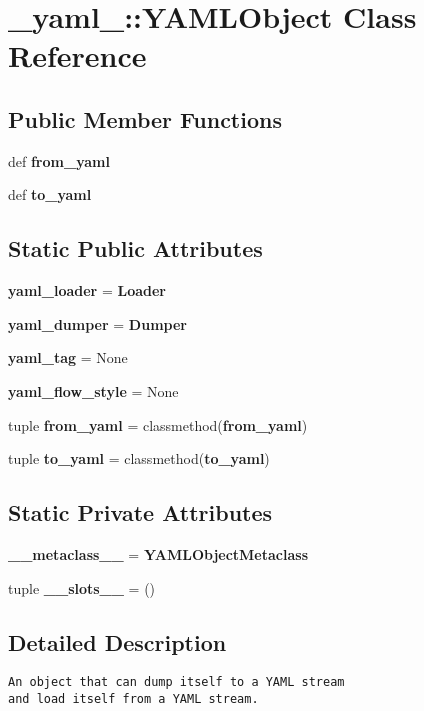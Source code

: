 \section{\_\-yaml\_\-::YAMLObject Class Reference}
\label{class__yaml___1_1YAMLObject}
\subsection*{Public Member Functions}
\begin{CompactItemize}
\item 
def {\bf from\_\-yaml}
\item 
def {\bf to\_\-yaml}
\end{CompactItemize}
\subsection*{Static Public Attributes}
\begin{CompactItemize}
\item 
{\bf yaml\_\-loader} = {\bf Loader}
\item 
{\bf yaml\_\-dumper} = {\bf Dumper}
\item 
{\bf yaml\_\-tag} = None
\item 
{\bf yaml\_\-flow\_\-style} = None
\item 
tuple {\bf from\_\-yaml} = classmethod({\bf from\_\-yaml})
\item 
tuple {\bf to\_\-yaml} = classmethod({\bf to\_\-yaml})
\end{CompactItemize}
\subsection*{Static Private Attributes}
\begin{CompactItemize}
\item 
{\bf \_\-\_\-metaclass\_\-\_\-} = {\bf YAMLObjectMetaclass}
\item 
tuple {\bf \_\-\_\-slots\_\-\_\-} = ()
\end{CompactItemize}


\subsection{Detailed Description}


\footnotesize\begin{verbatim}
An object that can dump itself to a YAML stream
and load itself from a YAML stream.
\end{verbatim}
\normalsize
 

